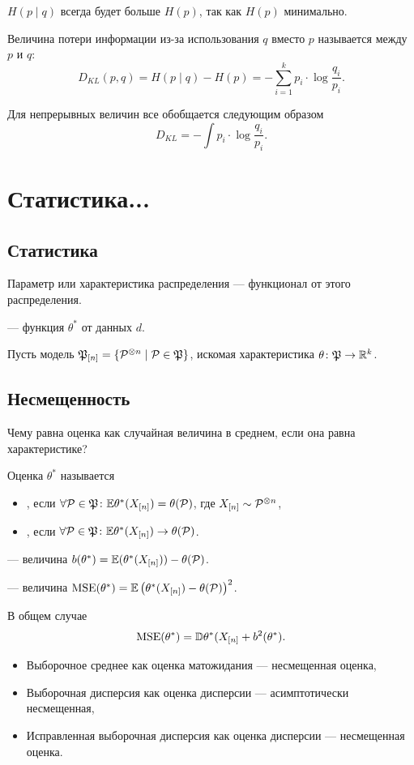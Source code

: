 \documentclass[11pt]{book}
\begin{document}
$H(p \mid q)$ всегда будет больше $H(p)$, так как $H(p)$ минимально.
\begin{definition}[]
	Величина потери информации из-за использования $q$ вместо $p$ называется  между $p$ и $q$:
	\[
	D_{KL} (p, q) = H(p \mid q) - H(p) = - \sum_{i=1}^{k} p_i \cdot \log{\frac{q_i}{p_i}}
	.\] 
\end{definition}
Для непрерывных величин все обобщается следующим образом 
\[
D_{KL} = - \int p_i \cdot \log{\frac{q_{i}}{p_i}}
.\] 

\section{Статистика...}
\subsection{Статистика}
Параметр или характеристика распределения --- функционал от этого распределения.
\begin{definition}[]
	 ---  функция $\theta^*$ от данных $d$.
\end{definition}

Пусть модель $\PP_{[n]} = \{\P ^{\otimes n} \mid \P \in \PP\}$, искомая характеристика $\theta\colon \PP \to \R^{k}$.

\subsection{Несмещенность}
Чему равна оценка как случайная величина в среднем, если она равна характеристике?

\begin{definition}[]
	Оценка $\theta^*$ называется
	\begin{itemize}
		\item {}, если $\forall \P \in \PP\colon \E \theta^*(X_{[n]}) = \theta(\P)$, где $X_{[n]} \sim \P^{\otimes n}$,
		\item {}, если $\forall \P \in \PP\colon \E \theta^*(X_{[n]}) \to \theta(\P)$.
	\end{itemize}

	 --- величина $b(\theta^*) = \E(\theta^*(X_{[n]})) - \theta(\P)$.

	 --- величина $\MSE(\theta^*) = \E \left( \theta^*(X_{[n]}) - \theta(\P) \right) ^2$.
\end{definition}
В общем случае 
\[
\MSE(\theta^*) = \D \theta^*(X_{[n]} + b^2(\theta^*)
.\] 
\begin{itemize}
	\item Выборочное среднее как оценка матожидания --- несмещенная оценка,
	\item Выборочная дисперсия как оценка дисперсии --- асимптотически несмещенная,
	\item Исправленная выборочная дисперсия как оценка дисперсии --- несмещенная оценка.
\end{itemize}
\end{document}
